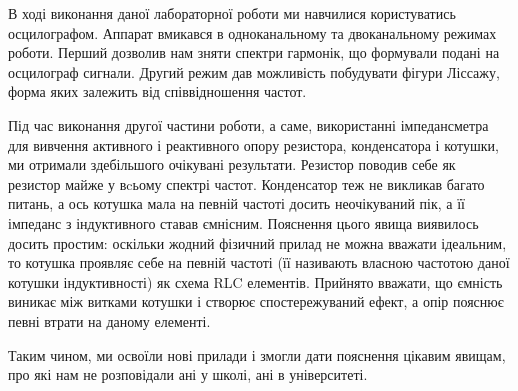 В ході виконання даної лабораторної роботи ми навчилися користуватись осцилографом. Аппарат вмикався в одноканальному та двоканальному режимах роботи. Перший дозволив нам зняти спектри гармонік, що формували подані на осцилограф сигнали. Другий режим дав можливість побудувати фігури Ліссажу, форма яких залежить від співвідношення частот.

Під час виконання другої частини роботи, а саме, використанні імпедансметра для вивчення активного і реактивного опору резистора, конденсатора і котушки, ми отримали здебільшого очікувані результати. Резистор поводив себе як резистор майже у вcьому спектрі частот. Конденсатор теж не викликав багато питань, а ось котушка мала на певній частоті досить неочікуваний пік, а її імпеданс з індуктивного ставав ємнісним. Пояснення цього явища виявилось досить простим: оскільки жодний фізичний прилад не можна вважати ідеальним, то котушка проявляє себе на певній частоті (її називають власною частотою даної котушки індуктивності) як схема RLC елементів. Прийнято вважати, що ємність виникає між витками котушки і створює спостережуваний ефект, а опір пояснює певні втрати на даному елементі.  

Таким чином, ми освоїли нові прилади і змогли дати пояснення цікавим явищам, про які нам не розповідали ані у школі, ані в університеті.

